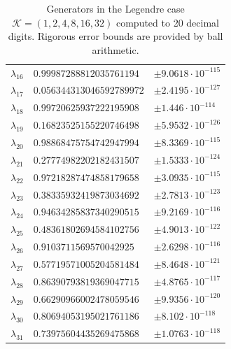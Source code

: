 \documentclass[a4paper,10pt]{article}
\begin{document}
\begin{appendix}
\begin{table}
\begin{tabular}{|l|ll|}
  $\lambda_{16}$ & $0.99987288812035761194$  &  $\pm 9.0618 \cdot 10^{-115}$ \\
  $\lambda_{17}$ & $0.056344313046592789972$ &  $\pm 2.4195 \cdot 10^{-127}$ \\
  $\lambda_{18}$ & $0.99720625937222195908$  &  $\pm 1.446 \cdot 10^{-114}$ \\
  $\lambda_{19}$ & $0.16823525155220746498$  &  $\pm 5.9532 \cdot 10^{-126}$ \\
  $\lambda_{20}$ & $0.98868475754742947994$  &  $\pm 8.3369 \cdot 10^{-115}$ \\
  $\lambda_{21}$ & $0.27774982202182431507$  &  $\pm 1.5333 \cdot 10^{-124}$ \\
  $\lambda_{22}$ & $0.97218287474858179658$  &  $\pm 3.0935 \cdot 10^{-115}$ \\
  $\lambda_{23}$ & $0.38335932419873034692$  &  $\pm 2.7813 \cdot 10^{-123}$ \\
  $\lambda_{24}$ & $0.94634285837340290515$  &  $\pm 9.2169 \cdot 10^{-116}$ \\
  $\lambda_{25}$ & $0.48361802694584102756$  &  $\pm 4.9013 \cdot 10^{-122}$ \\
  $\lambda_{26}$ & $0.9103711569570042925$   &  $\pm 2.6298 \cdot 10^{-116}$ \\
  $\lambda_{27}$ & $0.57719571005204581484$  &  $\pm 8.4648 \cdot 10^{-121}$ \\
  $\lambda_{28}$ & $0.86390793819369047715$  &  $\pm 4.8765 \cdot 10^{-117}$ \\
  $\lambda_{29}$ & $0.66290966002478059546$  &  $\pm 9.9356 \cdot 10^{-120}$ \\
  $\lambda_{30}$ & $0.80694053195021761186$  &  $\pm 8.102 \cdot 10^{-118}$ \\
  $\lambda_{31}$ & $0.73975604435269475868$  &  $\pm 1.0763 \cdot 10^{-118}$ \\
  \hline
  \end{tabular}
  \caption{Generators in the Legendre case $\mathcal{K} = (1,2,4,8,16,32)$
  computed to 20 decimal digits. Rigorous error bounds are provided by ball
  arithmetic.}
\end{table}


\end{appendix}
\end{document}
